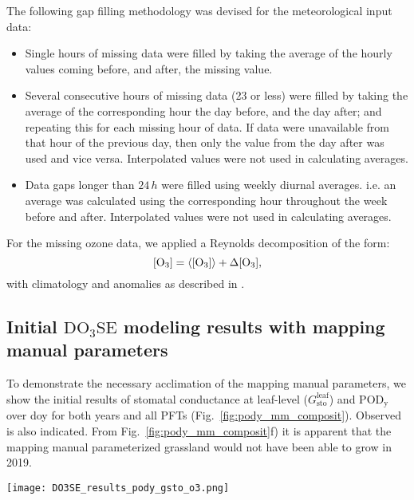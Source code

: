 \documentclass[bg, manuscript]{copernicus}
\begin{document}
The following gap filling methodology was devised for the meteorological input data:
\begin{itemize}
\item Single hours of missing data were filled by taking the average of the hourly values coming before, and after, the missing value.
\item Several consecutive hours of missing data (23 or less) were filled by taking the average of the corresponding hour the day before, and the day after; and repeating this for each missing hour of data. If data were unavailable from that hour of the previous day, then only the value from the day after was used and vice versa. Interpolated values were not used in calculating averages.
\item Data gaps longer than $24\,\unit{h}$ were filled using weekly diurnal averages. i.e. an average was calculated using the corresponding hour throughout the week before and after. Interpolated values were not used in calculating averages.
\end{itemize}

For the missing ozone data, we applied a Reynolds decomposition of the form:
\begin{equation}
  \chem{[O_3]} = \chem{\left<[O_3]\right>} + \chem{\Delta[O_3]},
  \label{eq:reynolds_decomp}
\end{equation}
with climatology \chem{\left<[O_3]\right>} and anomalies \chem{\Delta[O_3]} as described in \citet{ACPD:Falk2021}.

\subsection{Initial $\mathrm{DO_3SE}$ modeling results with mapping manual parameters}
To demonstrate the necessary acclimation of the mapping manual parameters, we show the initial results of stomatal conductance at leaf-level ($G_\mathrm{sto}^\mathrm{leaf}$) and $\mathrm{POD_y}$ over \unit{doy} for both years and all PFTs (Fig.~\ref{fig:pody_mm_composit}). Observed \chem{[O_3]} is also indicated. From Fig.~\ref{fig:pody_mm_composit}f) it is apparent that the mapping manual parameterized grassland would not have been able to grow in 2019.

\begin{figure*}[t]
  \texttt{[image: DO3SE\_results\_pody\_gsto\_o3.png]}
  \caption{$\mathrm{DO_3SE}$ modeling results for mapping manual default parameterization. $\mathrm{POD_y}$ is shown over \unit{doy}, March--October. A flux threshold $y=1\,\unit{nmol\,m^{-2}\,s^{-1}}$ per projected leaf area (PLA) has been chosen. \chem{[O_3]} are plotted on the same axis and scales as $G_\text{sto}^\text{leaf}$ but in units of $\unit{ppb}$. (a, b) deciduous tree; (c, d) coniferous tree; (e, f) perennial grassland. From left to right: 2018, 2019.}
  \label{fig:pody_mm_composit}
\end{figure*}
\end{document}

